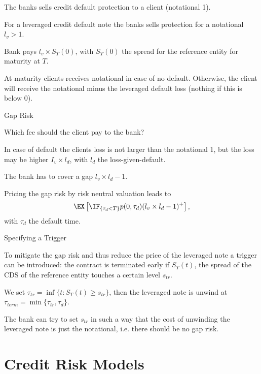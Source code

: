 	The banks sells credit default protection to a client (notational 1).


	For a leveraged credit default note the banks sells protection for a notational $l_v>1$.


	Bank pays $l_v \times S_T(0)$, with $S_T(0)$ the spread for the reference entity for maturity at $T$.


	At maturity clients receives notational in case of no default. Otherwise, the client will receive the notational minus the leveraged default loss (nothing if this is below 0).





{Gap Risk}






	Which fee should the client pay to the bank?


	In case of default the clients loss is not larger than the notational $1$, but the loss may be higher $I_v \times l_d$, with $l_d$ the loss-given-default.


	The bank has to cover a gap $l_v \times l_d -1$.


	Pricing the gap risk by risk neutral valuation leads to
$$
\EX\left[\IF_{\{\tau_d < T\}} p(0,\tau_d)(l_v \times l_d -1)^+\right],
$$
with $\tau_d$ the default time.






{Specifying a Trigger}






	To mitigate the gap risk and thus reduce the price of the leveraged note a trigger can be introduced: the contract is terminated early if $S_T(t)$, the spread of the CDS of the reference entity touches a certain level  $s_{tr}$.


	We set $\tau_{tr}= \inf\{t: S_T(t) \geq s_{tr}\}$, then the leveraged note is unwind at $\tau_{term}= \min\{\tau_{tr}, \tau_{d} \}$.


	The bank can try to set $s_{tr}$ in such a way that the cost of unwinding the leveraged note is just the notational, i.e. there should be no gap risk.





\section{Credit Risk Models}
